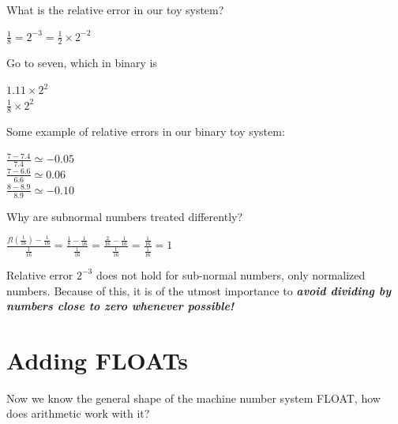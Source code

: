 \documentclass[a4paper,12pt,]{report}
\begin{document}
	What is the relative error in our toy system?

\begin{center}
	$\frac{1}{8}=2^{-3}=\frac{1}{2} \times 2^{-2}$
\end{center}

	Go to seven, which in binary is

\begin{center}
	$1.11 \times 2^2$\\
	$\frac{1}{8} \times 2^2$\\
\end{center}


	Some example of relative errors in our binary toy system:

\begin{center}
	$\frac{7-7.4}{7.4}\simeq -0.05$\\
	\bigskip
	$\frac{7-6.6}{6.6} \simeq 0.06$\\
	\bigskip
	$\frac{8-8.9}{8.9} \simeq -0.10$\\
\end{center}

	Why are subnormal numbers treated differently?

\begin{center}
	\begin{Large}
	$\frac{fl(\frac{1}{16})-\frac{1}{16}}{\frac{1}{16}}
		=\frac{\frac{1}{8}-\frac{1}{16}}{\frac{1}{16}}
		=\frac{\frac{2}{16}-\frac{1}{16}}{\frac{1}{16}}=\frac{\frac{1}{16}}{\frac{1}{16}}=1$
	\end{Large}
\end{center}

	Relative error $2^{-3}$ does not hold for sub-normal numbers, only normalized numbers.  
	Because of this, it is of the utmost importance to \textit{\textbf{avoid dividing by numbers close to 
	zero whenever possible!}}

\section{Adding FLOATs}

	Now we know the general shape of the machine number system FLOAT, how does arithmetic work 
	with it?
\end{document}
